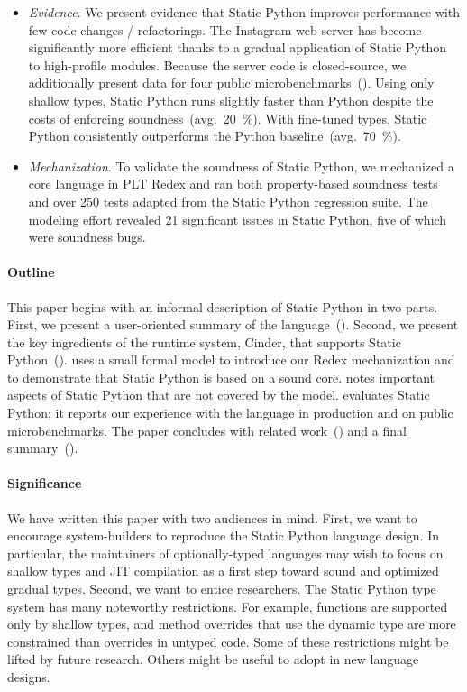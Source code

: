 \documentclass[english,cleveref,crc]{programming}
\newcommand{\SP}{Static Python}
\newcommand{\pctnum}[1]{\SI{#1}{\percent}}
\begin{document}
\begin{itemize}
  \item
    \emph{Evidence}.
    We present evidence that \SP{} improves performance with few code changes
    / refactorings.
    The Instagram web server has become significantly more efficient
    thanks to a gradual application of \SP{} to high-profile modules.
    Because the server code is closed-source, we additionally present data for
    four public microbenchmarks~().
    Using only shallow types, \SP{} runs slightly faster than Python
    despite the costs of enforcing soundness~(avg.~\pctnum{20}).
    With fine-tuned types, \SP{} consistently outperforms the Python
    baseline~(avg.~\pctnum{70}).

  \item
    \emph{Mechanization}.
    To validate the soundness of \SP{}, we mechanized a core language in PLT Redex
    and ran both property-based soundness tests and over 250 tests adapted from the \SP{} regression suite.
    The modeling effort revealed 21 significant issues in \SP{},
    five of which were soundness bugs.

\end{itemize}

\paragraph*{Outline}

This paper begins with an informal description of \SP{} in two parts.
First, we present a user-oriented summary of the language~().
Second, we present the key ingredients of the runtime system, Cinder,
that supports \SP{}~().
 uses a small formal model to introduce our Redex mechanization
and to demonstrate that \SP{} is based on a sound core.
 notes important aspects of \SP{} that are not covered by the model.
 evaluates \SP{}; it reports our experience with the language in
production and on public microbenchmarks.
The paper concludes with related work~()
and a final summary~().


\paragraph*{Significance}

We have written this paper with two audiences in mind.
First, we want to encourage system-builders to reproduce the
\SP{} language design.
In particular, the maintainers of optionally-typed languages
may wish to focus on shallow types and JIT compilation as a
first step toward sound and optimized gradual types.
Second, we want to entice researchers.
The \SP{} type system has many noteworthy restrictions.
For example, functions are supported only by shallow types,
and method overrides that use the dynamic type are more constrained
than overrides in untyped code.
Some of these restrictions might be lifted by future research.
Others might be useful to adopt in new language designs.
\end{document}

